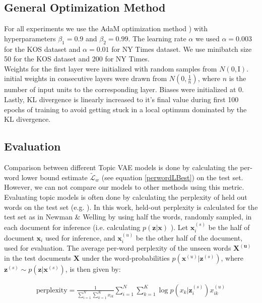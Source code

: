 \documentclass{report}
\begin{document}
	\subsection{General Optimization Method}\label{optim_section}
	For all experiments we use the AdaM optimization method \cite{kingma2014adam}) with hyperparameters $\beta_1 = 0.9$ and $\beta_2 = 0.99$. The learning rate $\alpha$ we used $\alpha = 0.003$ for the KOS dataset and $\alpha = 0.01$ for NY Times dataset.  We use minibatch size 50 for the KOS dataset and 200 for NY Times.  \\
	Weights for the first layer were initialized with random samples from $N(0,\text{I})$. initial weights in consecutive layers were drawn from  $N(0,\frac{1}{n})$, where $n$ is the number of input units to the corresponding layer. Biases were initialized at 0.
	\\Lastly, KL divergence is linearly increased to it's final value during first 100 epochs of training to avoid getting stuck in a local optimum dominated by the KL divergence. 	
	
	\subsection{Evaluation}
	Comparison between different Topic VAE models is done by calculating the per-word lower bound estimate $\tilde{\mathcal{L}}_w$ (see equation \ref{perwordLBest}) on the test set. However, we can not compare our models to other methods using this metric. \\
	Evaluating topic models is often done by calculating the perplexity of held out words on the test set (e.g. \cite{blei2003latent, newman2007distributed, ranganath2015deep}). In this work, held-out perplexity is calculated for the test set as in Newman \& Welling \cite{newman2007distributed} by using half the words, randomly sampled, in each document for inference (i.e. calculating $p(\mathbf{z}|\mathbf{x})$ ). Let $\mathbf{x}_{i}^{(s)}$ be the half of document $\mathbf{x}_i$ used for inference, and $\mathbf{x}_{i}^{(u)}$ be the other half of the document, used for evaluation. The average per-word perplexity of the unseen words $\mathbf{X^{(u)}}$ in the test documents $\mathbf{X}$ under the word-probabilities $p(\mathbf{x}^{(u)}|\mathbf{z}^{(s)})$, where $\mathbf{z}^{(s)} \sim p(\mathbf{z}|\mathbf{x}^{(s)})$, is then given by:
	
	
	\begin{align}
	\text{perplexity} =  \frac{1}{\sum\limits_{i=1}^{N}\sum\limits_{k=1}^{K}x_{ik}}\sum\limits_{i=1}^N\sum\limits_{k=1}^{K} \log p(x_{k}|\mathbf{z}_{i}^{(s)})x_{ik}^{(u)}
	\end{align}\\
	
\end{document}
